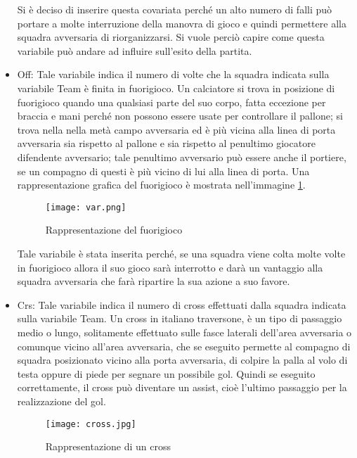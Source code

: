 \begin{itemize}
	Si è deciso di inserire questa covariata perché un alto numero di falli può portare a molte interruzione della manovra di gioco e quindi permettere alla squadra avversaria di riorganizzarsi. Si vuole perciò capire come questa variabile può andare ad influire sull'esito della partita.
	\item \textsf{Off}: Tale variabile indica il numero di volte che la squadra indicata sulla variabile \textsf{Team} è finita in fuorigioco. Un calciatore si trova in posizione di fuorigioco quando una qualsiasi parte del suo corpo, fatta eccezione per braccia e mani perché non possono essere usate per controllare il pallone; si trova nella nella metà campo avversaria ed è più vicina alla linea di porta avversaria sia rispetto al pallone e sia rispetto al penultimo giocatore difendente avversario; tale penultimo avversario può essere anche il portiere, se un compagno di questi è più vicino di lui alla linea di porta. Una rappresentazione grafica del fuorigioco è mostrata nell'immagine \ref{fig:offside}.
	
	\begin{figure}[!h]
		\begin{center}
			\texttt{[image: var.png]}
			\caption{Rappresentazione del fuorigioco} \label{fig:offside}
		\end{center}
	\end{figure}

	Tale variabile è stata inserita perché, se una squadra viene colta molte volte in fuorigioco allora il suo gioco sarà interrotto e darà un vantaggio alla squadra avversaria che farà ripartire la sua azione a suo favore.
	
	
	\item \textsf{Crs}: Tale variabile indica il numero di cross effettuati dalla squadra indicata sulla variabile \textsf{Team}. Un cross in italiano traversone, è un tipo di passaggio medio o lungo, solitamente effettuato sulle fasce laterali dell'area avversaria o comunque vicino all'area avversaria, che se eseguito permette al compagno di squadra posizionato vicino alla porta avversaria, di colpire la palla al volo di testa oppure di piede per segnare un possibile gol. Quindi se eseguito correttamente, il cross può diventare un assist, cioè l'ultimo passaggio per la realizzazione del gol. 
	
	\begin{figure}[!h]
		\begin{center}
			\texttt{[image: cross.jpg]}
			\caption{Rappresentazione di un cross} \label{fig:cross}
		\end{center}
	\end{figure}
	

\end{itemize}
